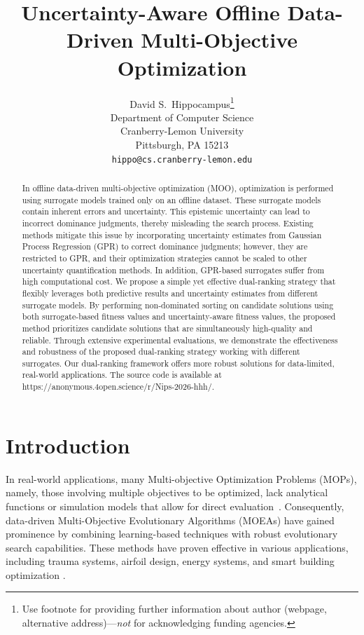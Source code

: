 \documentclass{article}
\title{Uncertainty-Aware Offline Data-Driven Multi-Objective Optimization}
\author{%
  David S.~Hippocampus\thanks{Use footnote for providing further information
    about author (webpage, alternative address)---\emph{not} for acknowledging
    funding agencies.} \\
  Department of Computer Science\\
  Cranberry-Lemon University\\
  Pittsburgh, PA 15213 \\
  \texttt{hippo@cs.cranberry-lemon.edu} \\
}
\begin{document}
\maketitle


\begin{abstract}
In offline data-driven multi-objective optimization (MOO), optimization is performed using surrogate models trained only on an offline dataset. These surrogate models contain inherent errors and uncertainty. This epistemic uncertainty can lead to incorrect dominance judgments, thereby misleading the search process. Existing methods mitigate this issue by incorporating uncertainty estimates from Gaussian Process Regression (GPR) to correct dominance judgments; however, they are restricted to GPR, and their optimization strategies cannot be scaled to other uncertainty quantification methods. In addition, GPR-based surrogates suffer from high computational cost. We propose a simple yet effective dual-ranking strategy that flexibly leverages both predictive results and uncertainty estimates from different surrogate models. By performing non-dominated sorting on candidate solutions using both surrogate-based fitness values and uncertainty-aware fitness values, the proposed method prioritizes candidate solutions that are simultaneously high-quality and reliable. Through extensive experimental evaluations, we demonstrate the effectiveness and robustness of the proposed dual-ranking strategy working with different surrogates. Our dual-ranking framework offers more robust solutions for data-limited, real-world applications. The source code is available at https://anonymous.4open.science/r/Nips-2026-hhh/.
\end{abstract}



\section{Introduction}
In real-world applications, many Multi-objective Optimization Problems (MOPs), namely, those involving multiple objectives to be optimized, lack analytical functions or simulation models that allow for direct evaluation~\cite{ddeo_rvea}. Consequently, data-driven Multi-Objective Evolutionary Algorithms (MOEAs) have gained prominence by combining learning-based techniques with robust evolutionary search capabilities. These methods have proven effective in various applications, including trauma systems, airfoil design, energy systems, and smart building optimization \cite{ddeo_1,ddeo_2,ddeo_ibea,building_opt2}.
\end{document}
